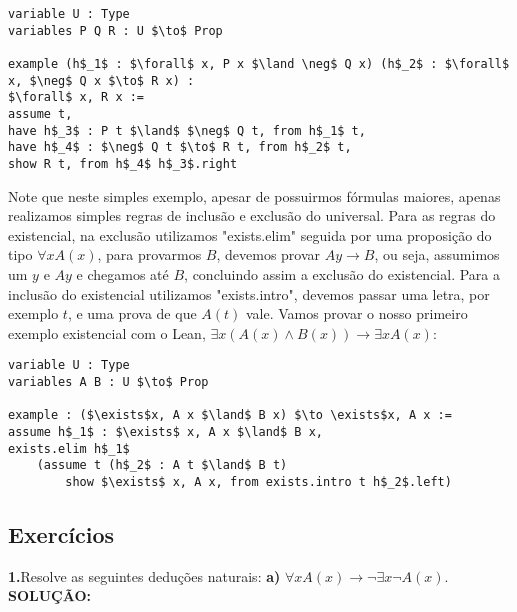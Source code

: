 \begin{lstlisting}
variable U : Type
variables P Q R : U $\to$ Prop

example (h$_1$ : $\forall$ x, P x $\land \neg$ Q x) (h$_2$ : $\forall$ x, $\neg$ Q x $\to$ R x) :
$\forall$ x, R x :=
assume t,
have h$_3$ : P t $\land$ $\neg$ Q t, from h$_1$ t,
have h$_4$ : $\neg$ Q t $\to$ R t, from h$_2$ t,
show R t, from h$_4$ h$_3$.right
\end{lstlisting}
Note que neste simples exemplo, apesar de possuirmos fórmulas maiores, apenas realizamos simples regras de inclusão e exclusão
do universal.
\newline Para as regras do existencial, na exclusão utilizamos "exists.elim" seguida por uma proposição do tipo $\forall x A(x)$,
para provarmos $B$, devemos provar $ A y \to B$, ou seja, assumimos um $y$ e $A y$ e chegamos até $B$, concluindo assim a exclusão
do existencial. Para a inclusão do existencial utilizamos "exists.intro", devemos passar uma letra, por exemplo $t$, e uma prova
de que $A(t)$ vale.
\newline Vamos provar o nosso primeiro exemplo existencial com o Lean, $\exists x (A(x) \land B(x)) \to \exists x A(x)$:
\begin{lstlisting}
variable U : Type
variables A B : U $\to$ Prop

example : ($\exists$x, A x $\land$ B x) $\to \exists$x, A x :=
assume h$_1$ : $\exists$ x, A x $\land$ B x,
exists.elim h$_1$
    (assume t (h$_2$ : A t $\land$ B t)
        show $\exists$ x, A x, from exists.intro t h$_2$.left) 
\end{lstlisting}
\subsection{Exercícios}
\textbf{1.}Resolve as seguintes deduções naturais:
\newline \textbf{a)} $\forall x A(x) \to \neg \exists x \neg A(x)$.
\newline \textbf{SOLUÇÃO:}

